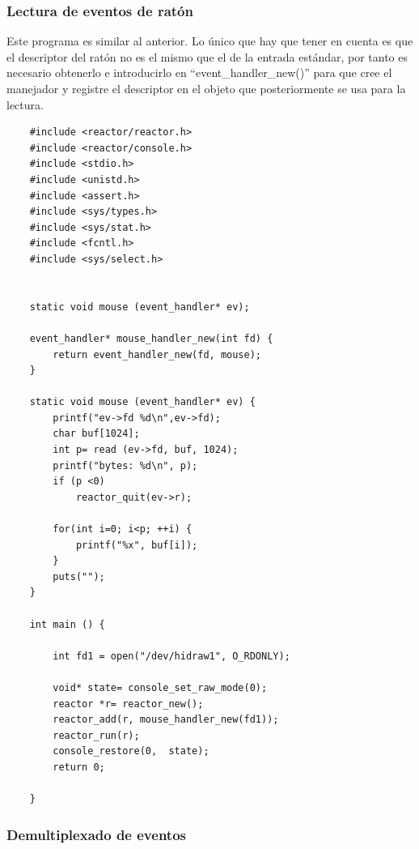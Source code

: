 \subsubsection{Lectura de eventos de ratón}\label{s3_1_2_2}

Este programa es similar al anterior. Lo único que hay que tener en cuenta es que el descriptor del ratón no es el mismo que el de la entrada estándar, por tanto es necesario obtenerlo e introducirlo en ``event\_handler\_new()'' para que cree el manejador y registre el descriptor en el objeto que posteriormente se usa para la lectura. \\

\begin{verbatim}
    #include <reactor/reactor.h>
    #include <reactor/console.h>
    #include <stdio.h>
    #include <unistd.h>
    #include <assert.h>
    #include <sys/types.h>
    #include <sys/stat.h>
    #include <fcntl.h>
    #include <sys/select.h>
    
    
    static void mouse (event_handler* ev);
    
    event_handler* mouse_handler_new(int fd) {
    	return event_handler_new(fd, mouse);
    }
    
    static void mouse (event_handler* ev) {
    	printf("ev->fd %d\n",ev->fd);
    	char buf[1024];
    	int p= read (ev->fd, buf, 1024);
    	printf("bytes: %d\n", p);
    	if (p <0)
    		reactor_quit(ev->r);
    		
    	for(int i=0; i<p; ++i) {
    		printf("%x", buf[i]);
    	}
    	puts("");
    }
    
    int main () {
    	
    	int fd1 = open("/dev/hidraw1", O_RDONLY);
    	
    	void* state= console_set_raw_mode(0);
    	reactor *r= reactor_new();
    	reactor_add(r, mouse_handler_new(fd1));
    	reactor_run(r);
    	console_restore(0,  state);
    	return 0;
    	
    }

    \end{verbatim}


\subsubsection{Demultiplexado de eventos}\label{s3_1_2_3}

